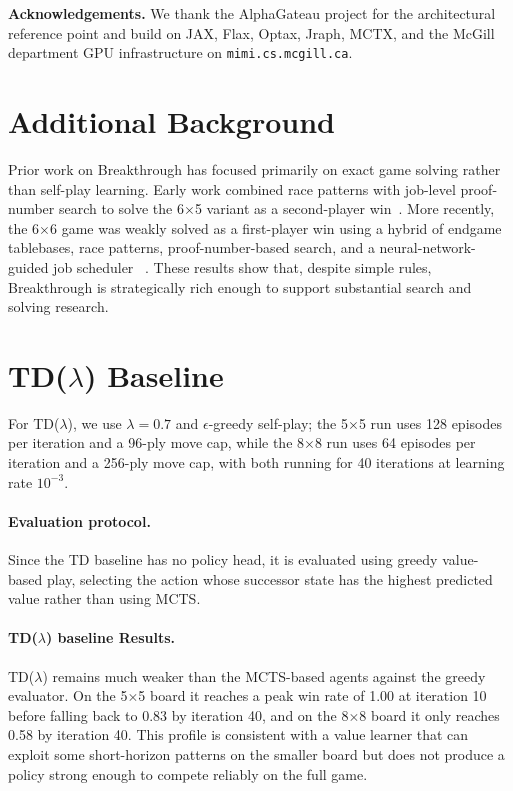 \documentclass{article}
\begin{document}
\textbf{Acknowledgements.}
We thank the AlphaGateau project for the architectural reference point and build on JAX, Flax,
Optax, Jraph, MCTX, and the McGill department GPU infrastructure on \texttt{mimi.cs.mcgill.ca}.

\newpage

\newpage
\appendix
\section{Additional Background}
\label{app:background}

Prior work on Breakthrough has focused primarily on exact game solving rather than self-play
learning. Early work combined race patterns with job-level proof-number search to solve the
6$\times$5 variant as a second-player win~\cite{saffidine2011breakthrough}. More recently, the
6$\times$6 game was weakly solved as a first-player win using a hybrid of endgame tablebases,
race patterns, proof-number-based search, and a neural-network-guided job scheduler
~\cite{jonsson2025solving}. These results show that, despite simple rules, Breakthrough is
strategically rich enough to support substantial search and solving research.

\section{TD($\lambda$) Baseline}
\label{app:tdlambda}

For TD($\lambda$), we use $\lambda = 0.7$ and $\epsilon$-greedy self-play; the 5$\times$5 run uses 128 episodes per iteration and a 96-ply move cap, while the 8$\times$8 run uses 64 episodes per iteration and a 256-ply move cap, with both running for 40 iterations at learning rate $10^{-3}$.
\paragraph{Evaluation protocol.}
Since the TD baseline has no policy head, it is evaluated using greedy value-based play, selecting
the action whose successor state has the highest predicted value rather than using MCTS.
\paragraph{TD($\lambda$) baseline Results.}
TD($\lambda$) remains much weaker than the MCTS-based agents against the greedy evaluator. On the
5$\times$5 board it reaches a peak win rate of 1.00 at iteration 10 before falling back to 0.83
by iteration 40, and on the 8$\times$8 board it only reaches 0.58 by iteration 40. This profile
is consistent with a value learner that can exploit some short-horizon patterns on the smaller
board but does not produce a policy strong enough to compete reliably on the full game.
\end{document}
